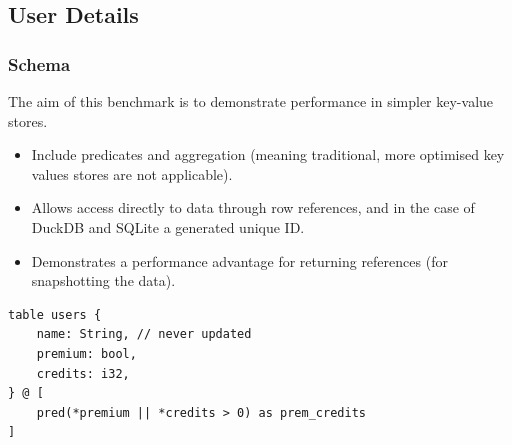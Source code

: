 \subsection{User Details}
\subsubsection{Schema}
The aim of this benchmark is to demonstrate performance in simpler key-value stores.
\begin{itemize}
    \setlength\itemsep{0em}
    \item Include predicates and aggregation (meaning traditional, more optimised key values stores are not applicable).
    \item Allows access directly to data through row references, and in the case of DuckDB and SQLite a generated unique ID.
    \item Demonstrates a performance advantage for returning references (for snapshotting the data).
\end{itemize}
\begin{verbatim}
table users {
    name: String, // never updated
    premium: bool,
    credits: i32,
} @ [
    pred(*premium || *credits > 0) as prem_credits
]
\end{verbatim}
